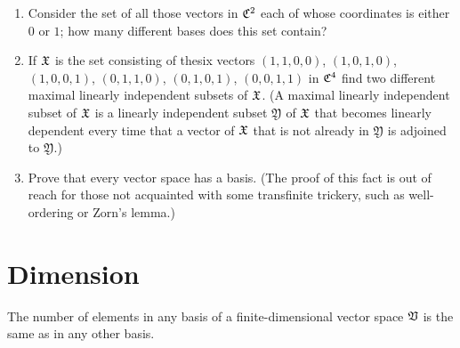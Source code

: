 {\begin{enumerate}[wide]
    \item Consider the set of all those vectors in \(\mathfrak{C}^2\) each of whose
    coordinates is either \(0\) or \(1\); how many different bases does this set
    contain?
    
    \item If \(\mathfrak{X}\) is the set consisting of thesix vectors \((1, 1,
    0,0)\), \((1, 0, 1, 0)\), \((1, 0, 0, 1)\), \((0, 1,1, 0)\), \((0, 1, 0,
    1)\), \((0, 0, 1, 1)\) in \(\mathfrak{C}^4\) find two different maximal linearly
    independent subsets of \(\mathfrak{X}\). (A maximal linearly independent subset
    of \(\mathfrak{X}\) is a linearly independent subset \(\mathfrak{Y}\) of \(\mathfrak{X}\)
    that becomes linearly dependent every time that a vector of \(\mathfrak{X}\) that
    is not already in \(\mathfrak{Y}\) is adjoined to \(\mathfrak{Y}\).) 
    
    \item Prove that every vector space has a basis. (The proof of this fact is
    out of reach for those not acquainted with some transfinite trickery, such
    as well-ordering or Zorn's lemma.)
\end{enumerate}
}

\section{Dimension}\label{sec-dimension}

\begin{theorem}
    The number of elements in any basis of a finite-dimensional vector space
    \(\mathfrak{V}\) is the same as in any other basis.
\end{theorem}

